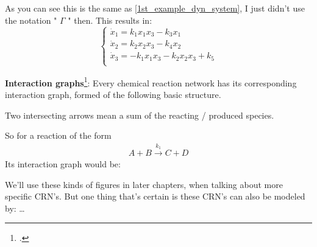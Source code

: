 As you can see this is the same as \ref{1st_example_dyn_system}, I just didn't use the notation " $\Gamma$ " then. This results in:
\[
	\begin{cases*}
		\dot{x}_1 = k_1 x_1 x_3 - k_3x_1  \\
		\dot{x}_2 = k_2 x_2 x_3 - k_4 x_2  \\
		\dot{x}_3 = -k_1 x_1 x_3 - k_2 x_2 x_3 + k_5 \\
	\end{cases*}
\]

\textbf{Interaction graphs}\footcite{Derbez2015}: Every chemical reaction network has its corresponding interaction graph, formed of the following basic structure.

Two intersecting arrows mean a sum of the reacting / produced species.

So for a reaction of the form
\begin{align*}
	A + B \xrightarrow{k_{1}} C + D
\end{align*}
Its interaction graph would be:

We'll use these kinds of figures in later chapters, when talking about more specific CRN's.
But one thing that's certain is these CRN's can also be modeled by: \ldots